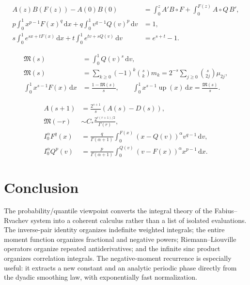 \documentclass[11pt,oneside]{article}
\theoremstyle{definition}
\newcommand{\F}{F}
\newcommand{\Q}{Q}
\newcommand{\upf}{\operatorname{up}}
\newcommand{\M}{\mathfrak M}
\newcommand{\dd}{\,\mathrm d}
\begin{document}
\begin{resultbox}
\begin{align*}
 A(z)B(\F(z))-A(0)B(0)
 &=\int_0^zA'B\circ\F
 +\int_0^{\F(z)}A\circ\Q\,B',\\
 p\int_0^1x^{p-1}\F(x)^q\dd x
 +q\int_0^1v^{q-1}\Q(v)^p\dd v&=1,\\
 s\int_0^1e^{sx+t\F(x)}\dd x
 +t\int_0^1e^{tv+s\Q(v)}\dd v&=e^{s+t}-1.
\end{align*}
\end{resultbox}

\begin{resultbox}
\begin{align*}
 \M(s)&=\int_0^1\Q(v)^s\dd v,\\
 \M(s)&=\sum_{k\ge0}(-1)^k\binom skm_k
 =2^{-s}\sum_{j\ge0}\binom{s}{2j}\mu_{2j},\\
 \int_0^1x^{s-1}\F(x)\dd x&=\frac{1-\M(s)}s,\qquad
 \int_0^1x^{s-1}\upf(x)\dd x=\frac{\M(s)}s.
\end{align*}
\end{resultbox}

\begin{resultbox}
\begin{align*}
 A(s+1)&=\frac{2^{s+1}}s(A(s)-D(s)),\\
 \M(-r)&\sim C_*\frac{2^{r(r+1)/2}}{\Gamma(r)},\\
 I_0^\alpha\F^q(x)
 &=\frac{q}{\Gamma(\alpha+1)}
 \int_0^{\F(x)}(x-\Q(v))^\alpha v^{q-1}\dd v,\\
 I_0^\alpha\Q^p(v)
 &=\frac{p}{\Gamma(\alpha+1)}
 \int_0^{\Q(v)}(v-\F(x))^\alpha x^{p-1}\dd x.
\end{align*}
\end{resultbox}

\section{Conclusion}

The probability/quantile viewpoint converts the integral theory of the Fabius--Rvachev
system into a coherent calculus rather than a list of isolated evaluations.  The
inverse-pair identity organizes indefinite weighted integrals; the entire moment function
organizes fractional and negative powers; Riemann--Liouville operators organize repeated
antiderivatives; and the infinite sinc product organizes correlation integrals.  The
negative-moment recurrence is especially useful: it extracts a new constant and an
analytic periodic phase directly from the dyadic smoothing law, with exponentially fast
normalization.
\end{document}
